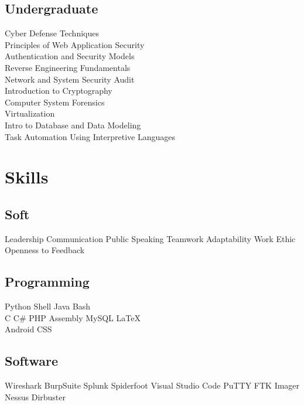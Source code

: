 \documentclass[]{deedy-resume-openfont}
\begin{document}
\begin{minipage}[t]{0.33\textwidth}
\subsection{Undergraduate}
\textbullet{} Cyber Defense Techniques \\
\textbullet{} Principles of Web Application Security \\
\textbullet{} Authentication and Security Models \\
\textbullet{} Reverse Engineering Fundamentals \\
\textbullet{} Network and System Security Audit \\
\textbullet{} Introduction to Cryptography \\
\textbullet{} Computer System Forensics \\
\textbullet{} Virtualization \\
\textbullet{} Intro to Database and Data Modeling \\
\textbullet{} Task Automation Using Interpretive Languages \\
\sectionsep


\section{Skills}

\subsection{Soft}
Leadership \textbullet{} Communication \textbullet{} Public Speaking \textbullet{} Teamwork \textbullet{} Adaptability \textbullet{} Work Ethic \textbullet{} Openness to Feedback 
\sectionsep

\subsection{Programming}
Python \textbullet{} Shell \textbullet{} Java \textbullet{} Bash \\
C \textbullet{} C# \textbullet{} PHP \textbullet{} Assembly \textbullet{} MySQL \textbullet{} \LaTeX\ \\
\textbullet{} Android \textbullet{} CSS
\sectionsep

\subsection{Software}
Wireshark \textbullet{} BurpSuite \textbullet{} Splunk \textbullet{} Spiderfoot \textbullet{} Visual Studio Code \textbullet{} PuTTY \textbullet{} FTK Imager \textbullet{} Nessus \textbullet{} Dirbuster
\sectionsep


\end{minipage}
\end{document}
